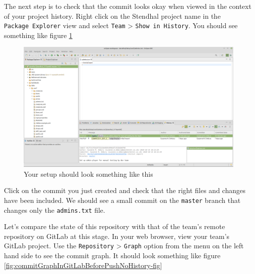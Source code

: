 \documentclass[
]{book}
\begin{document}
The next step is to check that the commit looks okay when viewed in the context of your project history. Right click on the Stendhal project name in the \texttt{Package\ Explorer} view and select \texttt{Team} \textgreater{} \texttt{Show\ in\ History}. You should see something like figure \ref{fig:localCommitGraphBeforePushNoHistory-fig}

\begin{figure}

{\centering \includegraphics[width=1\linewidth]{images/localCommitGraphBeforePushNoHistory} 

}

\caption{Your setup should look something like this}\label{fig:localCommitGraphBeforePushNoHistory-fig}
\end{figure}

Click on the commit you just created and check that the right files and changes have been included. We should see a small commit on the \texttt{master} branch that changes only the \texttt{admins.txt} file.

Let's compare the state of this repository with that of the team's remote repository on GitLab at this stage. In your web browser, view your team's GitLab project. Use the \texttt{Repository} \textgreater{} \texttt{Graph} option from the menu on the left hand side to see the commit graph. It should look something like figure \ref{fig:commitGraphInGitLabBeforePushNoHistory-fig}
\end{document}
